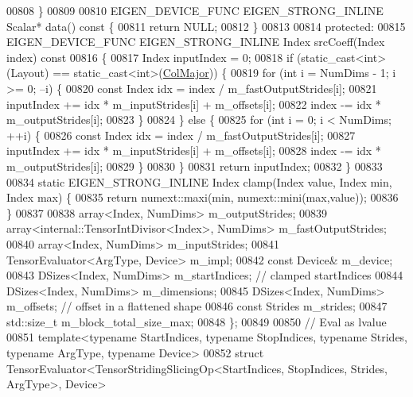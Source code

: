 \begin{DoxyCode}
00808   \}
00809 
00810   EIGEN\_DEVICE\_FUNC EIGEN\_STRONG\_INLINE Scalar* data()\textcolor{keyword}{ const }\{
00811     \textcolor{keywordflow}{return} NULL;
00812   \}
00813 
00814  \textcolor{keyword}{protected}:
00815   EIGEN\_DEVICE\_FUNC EIGEN\_STRONG\_INLINE Index srcCoeff(Index index)\textcolor{keyword}{ const}
00816 \textcolor{keyword}{  }\{
00817     Index inputIndex = 0;
00818     \textcolor{keywordflow}{if} (static\_cast<int>(Layout) == static\_cast<int>(\hyperlink{group__enums_ggaacded1a18ae58b0f554751f6cdf9eb13a0cbd4bdd0abcfc0224c5fcb5e4f6669a}{ColMajor})) \{
00819       \textcolor{keywordflow}{for} (\textcolor{keywordtype}{int} i = NumDims - 1; i >= 0; --i) \{
00820         \textcolor{keyword}{const} Index idx = index / m\_fastOutputStrides[i];
00821         inputIndex += idx * m\_inputStrides[i] + m\_offsets[i];
00822         index -= idx * m\_outputStrides[i];
00823       \}
00824     \} \textcolor{keywordflow}{else} \{
00825       \textcolor{keywordflow}{for} (\textcolor{keywordtype}{int} i = 0; i < NumDims; ++i) \{
00826         \textcolor{keyword}{const} Index idx = index / m\_fastOutputStrides[i];
00827         inputIndex += idx * m\_inputStrides[i] + m\_offsets[i];
00828         index -= idx * m\_outputStrides[i];
00829       \}
00830     \}
00831     \textcolor{keywordflow}{return} inputIndex;
00832   \}
00833 
00834   \textcolor{keyword}{static} EIGEN\_STRONG\_INLINE Index clamp(Index value, Index min, Index max) \{
00835     \textcolor{keywordflow}{return} numext::maxi(min, numext::mini(max,value));
00836   \}
00837 
00838   array<Index, NumDims> m\_outputStrides;
00839   array<internal::TensorIntDivisor<Index>, NumDims> m\_fastOutputStrides;
00840   array<Index, NumDims> m\_inputStrides;
00841   TensorEvaluator<ArgType, Device> m\_impl;
00842   \textcolor{keyword}{const} Device& m\_device;
00843   DSizes<Index, NumDims> m\_startIndices; \textcolor{comment}{// clamped startIndices}
00844   DSizes<Index, NumDims> m\_dimensions;
00845   DSizes<Index, NumDims> m\_offsets; \textcolor{comment}{// offset in a flattened shape}
00846   \textcolor{keyword}{const} Strides m\_strides;
00847   std::size\_t m\_block\_total\_size\_max;
00848 \};
00849 
00850 \textcolor{comment}{// Eval as lvalue}
00851 \textcolor{keyword}{template}<\textcolor{keyword}{typename} StartIndices, \textcolor{keyword}{typename} StopIndices, \textcolor{keyword}{typename} Str\textcolor{keywordtype}{id}es, \textcolor{keyword}{typename} ArgType, \textcolor{keyword}{typename} Device>
00852 \textcolor{keyword}{struct }TensorEvaluator<TensorStridingSlicingOp<StartIndices, StopIndices, Strides, ArgType>, Device>

\end{DoxyCode}
